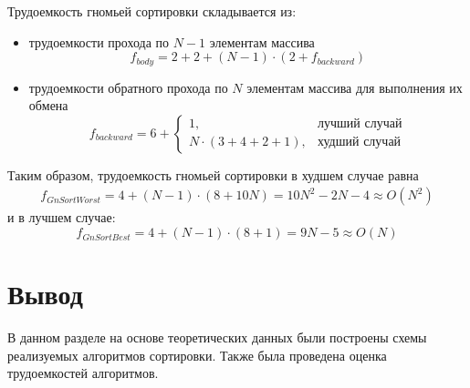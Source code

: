 Трудоемкость гномьей сортировки складывается из:
\begin{itemize}
    \item трудоемкости прохода по $N - 1$ элементам массива
    \begin{equation}
        f_{body} = 2 + 2 + (N - 1) \cdot (2 + f_{backward})
    \end{equation}
    \item трудоемкости обратного прохода по $N$ элементам массива для выполнения их обмена
    \begin{equation}
        f_{backward} = 6 +
        \begin{cases}
            1, & \text{лучший случай}\\
            N \cdot (3 + 4 + 2 + 1), & \text{худший случай}
        \end{cases}
    \end{equation}
\end{itemize}

Таким образом, трудоемкость гномьей сортировки в худшем случае равна
\begin{equation}
    \begin{gathered}
        f_{GnSortWorst} = 4 + (N - 1) \cdot (8 + 10N) = 10N^2 - 2N - 4 \approx O(N^2)
    \end{gathered}
\end{equation}
и в лучшем случае:
\begin{equation}
    f_{GnSortBest} = 4 + (N - 1) \cdot (8 + 1) = 9N - 5 \approx O(N)
\end{equation}

\section*{Вывод}

В данном разделе на основе теоретических данных были построены схемы реализуемых алгоритмов сортировки.
Также была проведена оценка трудоемкостей алгоритмов.